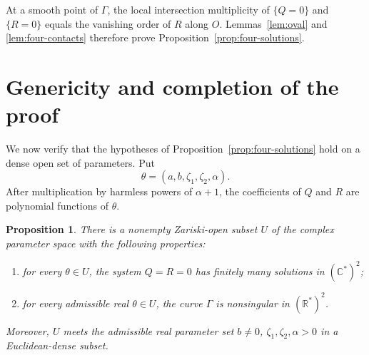 \documentclass[10pt,reqno]{amsart}
\numberwithin{equation}{section}
\theoremstyle{plain}
\newtheorem{proposition}[theorem]{Proposition}
\theoremstyle{remark}
\newcommand{\R}{\mathbb{R}}
\newcommand{\C}{\mathbb{C}}
\begin{document}
At a smooth point of $\Gamma$, the local intersection multiplicity of
$\{Q=0\}$ and $\{R=0\}$ equals the vanishing order of $R$ along $O$.
Lemmas~\ref{lem:oval} and \ref{lem:four-contacts} therefore prove
Proposition~\ref{prop:four-solutions}.

\section{Genericity and completion of the proof}\label{sec:genericity}

We now verify that the hypotheses of
Proposition~\ref{prop:four-solutions} hold on a dense open set of
parameters.  Put
\begin{equation}\label{eq:theta}
  \theta=(a,b,\zeta_1,\zeta_2,\alpha).
\end{equation}
After multiplication by harmless powers of $\alpha+1$, the coefficients
of $Q$ and $R$ are polynomial functions of $\theta$.

\begin{proposition}\label{prop:genericity}
There is a nonempty Zariski-open subset $U$ of the complex parameter space
with the following properties:
\begin{enumerate}[label=\textup{(G\arabic*)},leftmargin=3.2em]
  \item\label{G1}
  for every $\theta\in U$, the system $Q=R=0$ has finitely many
  solutions in $(\C^*)^2$;
  \item\label{G2}
  for every admissible real $\theta\in U$, the curve $\Gamma$ is
  nonsingular in $(\R^*)^2$.
\end{enumerate}
Moreover, $U$ meets the admissible real parameter set
$b\neq0$, $\zeta_1,\zeta_2,\alpha>0$ in a Euclidean-dense subset.
\end{proposition}
\end{document}
